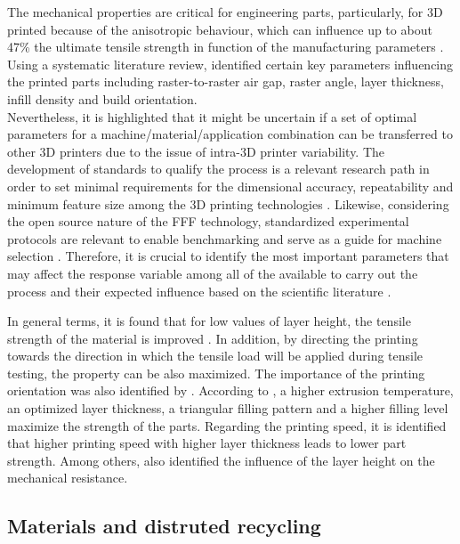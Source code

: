 \documentclass[]{interact}
\theoremstyle{plain}%
\theoremstyle{definition}
\theoremstyle{remark}
\begin{document}
The mechanical properties are critical for engineering parts,
particularly, for 3D printed because of the anisotropic behaviour, which
can influence up to about 47\% the ultimate tensile strength in function
of the manufacturing parameters \citep{Laureto2018}. Using a systematic
literature review, \citet{Popescu2018} identified certain key parameters
influencing the printed parts including raster-to-raster air gap, raster
angle, layer thickness, infill density and build orientation.\\
Nevertheless, it is highlighted that it might be uncertain if a set of
optimal parameters for a machine/material/application combination can be
transferred to other 3D printers due to the issue of intra-3D printer
variability. The development of standards to qualify the process is a
relevant research path in order to set minimal requirements for the
dimensional accuracy, repeatability and minimum feature size among the
3D printing technologies \citep{Rebaioli2017}. Likewise, considering the
open source nature of the FFF technology, standardized experimental
protocols are relevant to enable benchmarking and serve as a guide for
machine selection \citep{CruzSanchez2014, Roberson2013}. Therefore, it
is crucial to identify the most important parameters that may affect the
response variable among all of the available to carry out the process
and their expected influence based on the scientific literature
\citep{JaisinghSheoran2019}.

In general terms, it is found that for low values of layer height, the
tensile strength of the material is improved \citep{Tymrak2014a}. In
addition, by directing the printing towards the direction in which the
tensile load will be applied during tensile testing, the property can be
also maximized. The importance of the printing orientation was also
identified by \citet{Yao2019}. According to \citet{Alafaghani2018}, a
higher extrusion temperature, an optimized layer thickness, a triangular
filling pattern and a higher filling level maximize the strength of the
parts. Regarding the printing speed, it is identified that higher
printing speed with higher layer thickness leads to lower part strength.
Among others, \citet{Altan2018} also identified the influence of the
layer height on the mechanical resistance.

\hypertarget{materials-and-distruted-recycling}{%
\subsection{Materials and distruted
recycling}\label{materials-and-distruted-recycling}}
\end{document}
